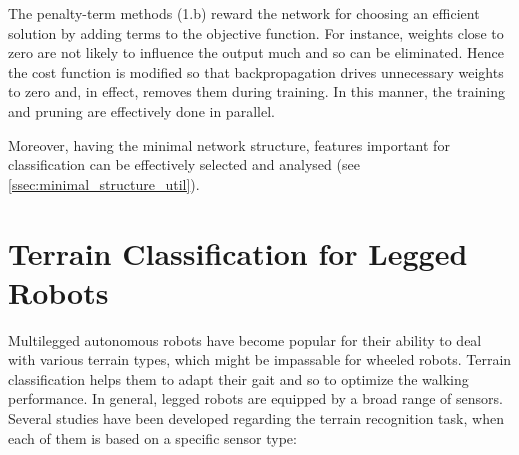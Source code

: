 The penalty-term methods (1.b) reward the network for choosing an efficient solution by adding terms to the objective function. For instance, weights close to zero are not likely to influence the output much and so can be eliminated. Hence the cost function is modified so that backpropagation drives unnecessary weights to zero and, in effect, removes them during training. In this manner, the training and pruning are effectively done in parallel.

Moreover, having the minimal network structure, features important for classification can be effectively selected and analysed (see \cref{ssec:minimal_structure_util}).

\section{Terrain Classification for Legged Robots} \label{sec:soa_terrain_classification}
Multilegged autonomous robots have become popular for their ability to deal with various terrain types, which might be impassable for wheeled robots. Terrain classification helps them to adapt their gait and so to optimize the walking performance. In general, legged robots are equipped by a broad range of sensors. Several studies have been developed regarding the terrain recognition task, when each of them is based on a specific sensor type:

